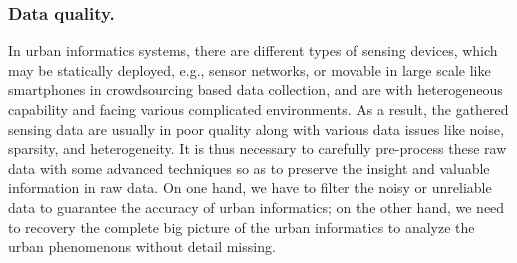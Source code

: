 \subsubsection{\textbf{Data quality.}} In urban informatics systems, there are different types of sensing devices, which may be statically deployed, e.g., sensor networks, or movable in large scale like smartphones in crowdsourcing based data collection,  and are with heterogeneous capability and facing various complicated environments. As a result, the gathered sensing data are usually in poor quality along with various data issues like noise, sparsity, and heterogeneity. It is thus necessary to carefully pre-process these raw data with some advanced techniques so as to preserve the insight and valuable information in raw data. On one hand, we have to filter the noisy or unreliable data to guarantee the accuracy of urban informatics; on the other hand, we need to recovery the complete big picture of the urban informatics to analyze the urban phenomenons without detail missing.

